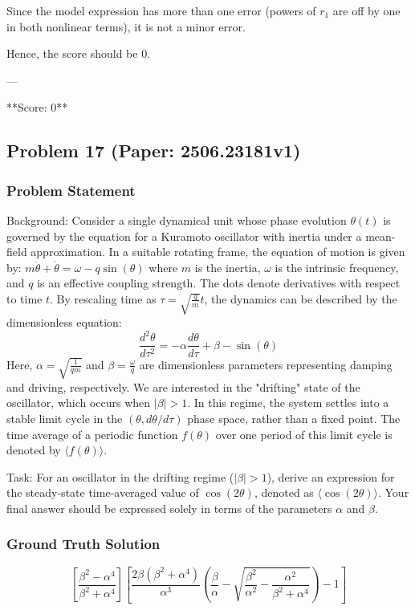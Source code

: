\documentclass[10pt]{article}
\begin{document}
Since the model expression has more than one error (powers of \(r_1\) are off by one in both nonlinear terms), it is not a minor error.

Hence, the score should be 0.

---

**Score: 0**

\newpage
\subsection*{Problem 17 (Paper: 2506.23181v1)}
\subsubsection*{Problem Statement}
Background:
Consider a single dynamical unit whose phase evolution $\theta(t)$ is governed by the equation for a Kuramoto oscillator with inertia under a mean-field approximation. In a suitable rotating frame, the equation of motion is given by:
$m \ddot{\theta} + \dot{\theta} = \omega - q \sin(\theta)$
where $m$ is the inertia, $\omega$ is the intrinsic frequency, and $q$ is an effective coupling strength. The dots denote derivatives with respect to time $t$. By rescaling time as $\tau = \sqrt{\frac{q}{m}} t$, the dynamics can be described by the dimensionless equation:
$$ \frac{d^2\theta}{d\tau^2} = - \alpha \frac{d\theta}{d\tau} + \beta - \sin(\theta) $$
Here, $\alpha = \sqrt{\frac{1}{qm}}$ and $\beta = \frac{\omega}{q}$ are dimensionless parameters representing damping and driving, respectively. We are interested in the "drifting" state of the oscillator, which occurs when $|\beta| > 1$. In this regime, the system settles into a stable limit cycle in the $(\theta, d\theta/d\tau)$ phase space, rather than a fixed point. The time average of a periodic function $f(\theta)$ over one period of this limit cycle is denoted by $\langle f(\theta) \rangle$.

Task:
For an oscillator in the drifting regime ($|\beta| > 1$), derive an expression for the steady-state time-averaged value of $\cos(2\theta)$, denoted as $\langle\cos(2\theta)\rangle$. Your final answer should be expressed solely in terms of the parameters $\alpha$ and $\beta$.

\subsubsection*{Ground Truth Solution}
\[ \boxed{\left[\frac{\beta^2 - \alpha^4}{\beta^2 + \alpha^4}\right] \left[ \frac{2\beta(\beta^2 + \alpha^4)}{\alpha^3}\left(\frac{\beta}{\alpha} - \sqrt{\frac{\beta^2}{\alpha^2} - \frac{\alpha^2}{\beta^2 + \alpha^4}} \right) - 1\right]} \]
\end{document}
